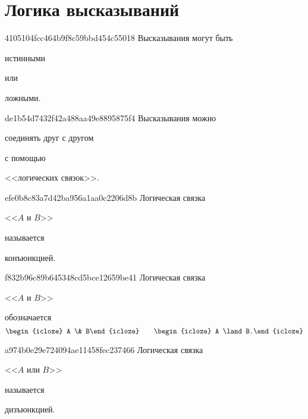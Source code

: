 


\section{Логика высказываний}
\begin{note}{4105104fcc464b9f8c59bbd454c55018}
    Высказывания могут быть \begin{icloze}{1}истинными\end{icloze} или \begin{icloze}{1}ложными.\end{icloze}
\end{note}

\begin{note}{de1b54d7432f42a488aa49e8895875f4}
    Высказывания можно \begin{icloze}{2}соединять друг с другом\end{icloze} с помощью \begin{icloze}{1}<<логических связок>>.\end{icloze}
\end{note}

\begin{note}{efe0b8c83a7d42ba956a1aa0c2206d8b}
    Логическая связка \begin{icloze}{2}<<\({ A }\) и \({ B }\)>>\end{icloze} называется \begin{icloze}{1}конъюнкцией.\end{icloze}
\end{note}

\begin{note}{f832b96c89b645348cd5bce12659be41}
    Логическая связка \begin{icloze}{2}<<\({ A }\) и \({ B }\)>>\end{icloze} обозначается
    \[
        \begin{icloze}{1}A \& B\end{icloze} \qquad \begin{icloze}{1}A \land B.\end{icloze}
    \]
\end{note}

\begin{note}{a974b0e29e724094ae11458fec237466}
    Логическая связка \begin{icloze}{2}<<\({ A }\) или \({ B }\)>>\end{icloze} называется \begin{icloze}{1}дизъюнкцией.\end{icloze}
\end{note}

